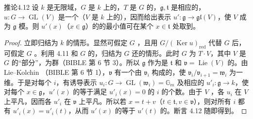 \begin{SGAresult}{推论}{4.12}
设 $k$ 是无限域，$G$ 是 $k$ 上的，$T$ 是 $G$ 的，$\mathfrak g,\mathfrak t$ 是相应的，$u:G\to\operatorname{GL}(V)$ 是一个（$V$ 是 $k$ 上的），因而给出表示 $u':\mathfrak g\to\mathfrak{gl}(V)$，使 $V$ 成为 $\mathfrak g$ 模。则 $u'(x)$（$x\in\mathfrak g$）的的最小值可在某个 $x\in\mathfrak t$ 处取到。
\end{SGAresult}
\begin{proof}
立即归结为 $k$ 的情形。显然可假定 $G$ ，且用 $G/(\operatorname{Ker}u)_{\mathrm{red}}$ 代替 $G$ 后，可假定 $G$ 。利用 4.11 和 $G$ 的，归结为 $G$ 还的情形。此时 $G$ 为 $T\cdot V$，其中 $V$ 是 $G$ 的“部分”，为群（BIBLE 第 6 节 3）。所以 $\mathfrak g$ 作为是  $\mathfrak t$ 和 $\mathfrak v=\operatorname{Lie}(V)$ 的。由 Lie--Kolchin （BIBLE 第 6 节 1），$\mathfrak v$ 有一个由 $\mathfrak v_i$ 构成的，使 $\mathfrak v_i/\mathfrak v_{i+1}=\mathfrak w_i$ 为一维。于是对每个 $i$，有诱导表示 $u_i:G\to\operatorname{GL}(\mathfrak w_i)=\mathbb G_m$ 及相应的 $u'_i:\mathfrak g\to k$，使对每个 $x\in\mathfrak g$，$u'(x)$ 的等于满足 $u'_i(x)=0$ 的 $i$ 的个数。由于 $V$ ，各 $u_i$ 在 $V$ 上平凡，因而各 $u'_i$ 在 $\mathfrak v$ 上平凡。所以若 $x=t+v$（$t\in\mathfrak t,v\in\mathfrak v$），则对所有 $i$ 都有 $u'_i(x)=u'_i(t)$，从而 $u'(x)$ 的等于 $u'(t)$ 的。断言 4.12 随即得到。
\end{proof}

